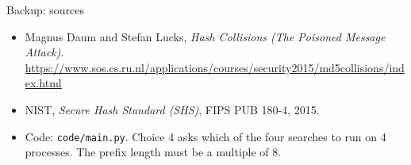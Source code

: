 \documentclass[aspectratio=169,11pt]{beamer}
\begin{document}
\begin{frame}{Backup: sources}
  \begin{itemize}
    \item Magnus Daum and Stefan Lucks, \emph{Hash Collisions (The Poisoned Message Attack)}.\\
          \url{https://www.sos.cs.ru.nl/applications/courses/security2015/md5collisions/index.html}
    \item NIST, \emph{Secure Hash Standard (SHS)}, FIPS PUB 180-4, 2015.
    \item Code: \texttt{code/main.py}. Choice 4 asks which of the four searches to run on 4 processes. The prefix length must be a multiple of 8.
  \end{itemize}
\end{frame}
\end{document}

